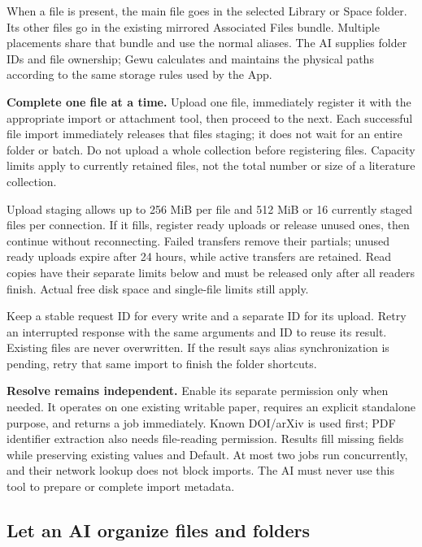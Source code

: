 \documentclass[10pt,letterpaper,oneside]{scrreprt}
\begin{document}
When a file is present, the main file goes in the selected Library or Space folder. Its other files go in the existing mirrored Associated Files bundle. Multiple placements share that bundle and use the normal aliases. The AI supplies folder IDs and file ownership; Gewu calculates and maintains the physical paths according to the same storage rules used by the App.

\textbf{Complete one file at a time.} Upload one file, immediately register it with the appropriate import or attachment tool, then proceed to the next. Each successful file import immediately releases that file\textquotesingle s staging; it does not wait for an entire folder or batch. Do not upload a whole collection before registering files. Capacity limits apply to currently retained files, not the total number or size of a literature collection.

Upload staging allows up to 256 MiB per file and 512 MiB or 16 currently staged files per connection. If it fills, register ready uploads or release unused ones, then continue without reconnecting. Failed transfers remove their partials; unused ready uploads expire after 24 hours, while active transfers are retained. Read copies have their separate limits below and must be released only after all readers finish. Actual free disk space and single-file limits still apply.

Keep a stable request ID for every write and a separate ID for its upload. Retry an interrupted response with the same arguments and ID to reuse its result. Existing files are never overwritten. If the result says alias synchronization is pending, retry that same import to finish the folder shortcuts.

\textbf{Resolve remains independent.} Enable its separate permission only when needed. It operates on one existing writable paper, requires an explicit standalone purpose, and returns a job immediately. Known DOI/arXiv is used first; PDF identifier extraction also needs file-reading permission. Results fill missing fields while preserving existing values and Default. At most two jobs run concurrently, and their network lookup does not block imports. The AI must never use this tool to prepare or complete import metadata.

\subsection{Let an AI organize files and folders}\label{let-an-ai-organize-files-and-folders}
\end{document}
